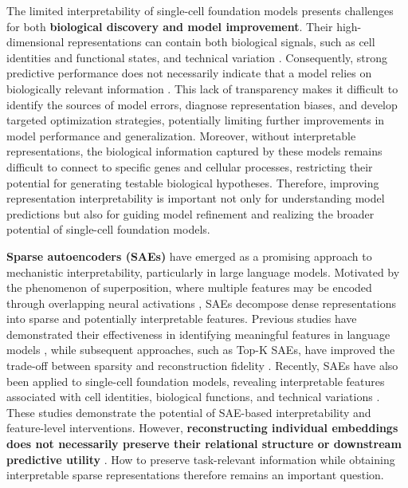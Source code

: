 \documentclass{article}
\begin{document}
The limited interpretability of single-cell foundation models presents challenges for both \textbf{biological discovery and model improvement}. Their high-dimensional representations can contain both biological signals, such as cell identities and functional states, and technical variation \citep{pedrocchi2025}. Consequently, strong predictive performance does not necessarily indicate that a model relies on biologically relevant information \citep{geirhos2020}. This lack of transparency makes it difficult to identify the sources of model errors, diagnose representation biases, and develop targeted optimization strategies, potentially limiting further improvements in model performance and generalization. Moreover, without interpretable representations, the biological information captured by these models remains difficult to connect to specific genes and cellular processes, restricting their potential for generating testable biological hypotheses. Therefore, improving representation interpretability is important not only for understanding model predictions but also for guiding model refinement and realizing the broader potential of single-cell foundation models.

\textbf{Sparse autoencoders (SAEs)} have emerged as a promising approach to mechanistic interpretability, particularly in large language models. Motivated by the phenomenon of superposition, where multiple features may be encoded through overlapping neural activations \citep{elhage2022}, SAEs decompose dense representations into sparse and potentially interpretable features. Previous studies have demonstrated their effectiveness in identifying meaningful features in language models \citep{bricken2023}, while subsequent approaches, such as Top-K SAEs, have improved the trade-off between sparsity and reconstruction fidelity \citep{gao2025}. Recently, SAEs have also been applied to single-cell foundation models, revealing interpretable features associated with cell identities, biological functions, and technical variations \citep{claye2025,pedrocchi2025}. These studies demonstrate the potential of SAE-based interpretability and feature-level interventions. However, \textbf{reconstructing individual embeddings does not necessarily preserve their relational structure or downstream predictive utility} \citep{park2019,karvonen2025}. How to preserve task-relevant information while obtaining interpretable sparse representations therefore remains an important question.
\end{document}
